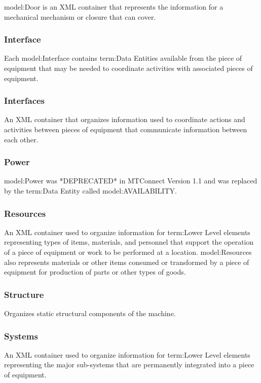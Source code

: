 {model:Door} is an XML container that represents the information for a mechanical mechanism or closure that can cover.

\FloatBarrier

\subsubsection{Interface}
  \label{sec:Interface}


Each {model:Interface} contains {term:Data Entities} available from the piece of equipment that may be needed to coordinate activities with associated pieces of equipment.

\FloatBarrier

\subsubsection{Interfaces}
  \label{sec:Interfaces}


An XML container that organizes information used to coordinate actions and activities between pieces of equipment that communicate information between each other.

\FloatBarrier

\subsubsection{Power}
  \label{sec:Power}


{model:Power} was *DEPRECATED* in MTConnect Version 1.1 and was replaced by the {term:Data Entity} called {model:AVAILABILITY}.

\FloatBarrier

\subsubsection{Resources}
  \label{sec:Resources}


An XML container used to organize information for {term:Lower Level} elements representing types of items, materials, and personnel that support the operation of a piece of equipment or work to be performed at a location. {model:Resources} also represents materials or other items consumed or transformed by a piece of equipment for production of parts or other types of goods.

\FloatBarrier

\subsubsection{Structure}
  \label{sec:Structure}


Organizes static structural components of the machine.

\FloatBarrier

\subsubsection{Systems}
  \label{sec:Systems}


An XML container used to organize information for {term:Lower Level} elements representing the major sub-systems that are permanently integrated into a piece of equipment.

\FloatBarrier

